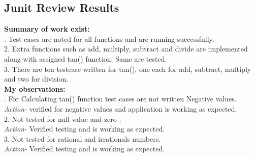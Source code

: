 \documentclass[a4paper,12pt]{article}
\begin{document}
\begin{titlepage}
\subsection{Junit  Review Results}
\textbf{Summary of work exist:}\\
.	Test cases are noted for all functions and are running successfully.\\
2.	Extra functions such as add, multiply, subtract and divide are implemented along with assigned tan() function. Same are tested.\\
3.	There are ten testcase written for tan(), one each for add, subtract, multiply and two for division.\\
\newline
\newline
\textbf{My observations:}\\
.	For Calculating tan() function test cases are not written Negative values. \\
\textit{Action-} verified for negative values and application is working as expected.\\
2.	Not tested for  null value  and zero .\\
\textit{Action-} Verified testing and is working as expected.\\
3.	Not tested for rational and irrationals numbers.\\
\textit{Action-} Verified testing and is working as expected.\\


\end{titlepage}
\end{document}

